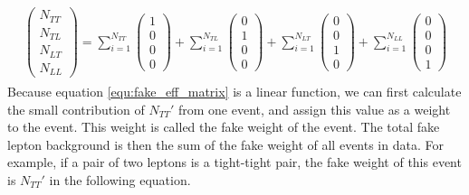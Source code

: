 \begin{align}
\begin{split}
\left( \begin{array}{c}
N_{TT} \\
N_{TL} \\
N_{LT} \\
N_{LL}
\end{array} \right)
=
\sum_{i=1}^{N_{TT}}
\left( \begin{array}{c}
1 \\
0 \\
0 \\
0
\end{array} \right)
+
\sum_{i=1}^{N_{TL}}
\left( \begin{array}{c}
0 \\
1 \\
0 \\
0
\end{array} \right)
+
\sum_{i=1}^{N_{LT}}
\left( \begin{array}{c}
0 \\
0 \\
1 \\
0
\end{array} \right)
+
\sum_{i=1}^{N_{LL}}
\left( \begin{array}{c}
0 \\
0 \\
0 \\
1
\end{array} \right)
\end{split}
\end{align}
Because equation \ref{equ:fake_eff_matrix} is a linear function, we can first calculate the small contribution of $N_{TT}'$ from one event, and assign this value as a weight to the event.
This weight is called the fake weight of the event.
The total fake lepton background is then the sum of the fake weight of all events in data.
For example, if a pair of two leptons is a tight-tight pair, the fake weight of this event is $N_{TT}'$ in the following equation.
